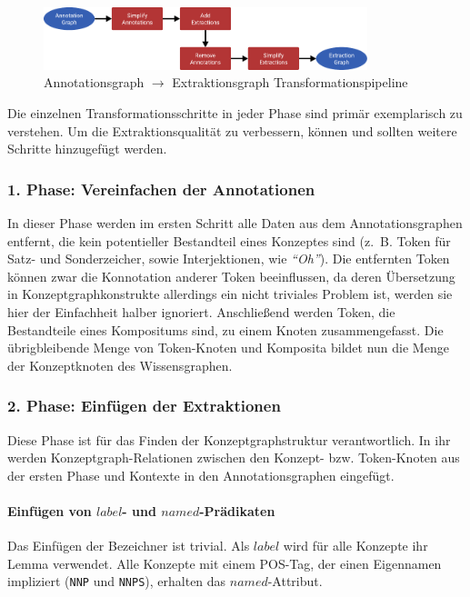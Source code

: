 \begin{figure}[h]
	\centering
	\includegraphics[width=0.84\textwidth]{gfx/text2kg/transformationPipeline.pdf}
	\caption{Annotationsgraph $\rightarrow$ Extraktionsgraph Transformationspipeline}\label{fig:text2kg:transformationPipeline}
\end{figure}
Die einzelnen Transformationsschritte in jeder Phase sind primär exemplarisch zu verstehen.
Um die Extraktionsqualität zu verbessern, können und sollten weitere Schritte hinzugefügt werden.

\subsubsection{1. Phase: Vereinfachen der Annotationen}
In dieser Phase werden im ersten Schritt alle Daten aus dem Annotationsgraphen entfernt, die kein potentieller Bestandteil eines Konzeptes sind (z.~B. Token für Satz- und Sonderzeicher, sowie Interjektionen, wie \textit{``Oh''}).
Die entfernten Token können zwar die Konnotation anderer Token beeinflussen, da deren Übersetzung in Konzeptgraphkonstrukte allerdings ein nicht triviales Problem ist, werden sie hier der Einfachheit halber ignoriert.
Anschließend werden Token, die Bestandteile eines Kompositums sind, zu einem Knoten zusammengefasst.
Die übrigbleibende Menge von Token-Knoten und Komposita bildet nun die Menge der Konzeptknoten des Wissensgraphen.

\subsubsection{2. Phase: Einfügen der Extraktionen}
Diese Phase ist für das Finden der Konzeptgraphstruktur verantwortlich.
In ihr werden Konzeptgraph-Relationen zwischen den Konzept- bzw. Token-Knoten aus der ersten Phase und Kontexte in den Annotationsgraphen eingefügt.

\paragraph{Einfügen von $label$- und $named$-Prädikaten}
Das Einfügen der Bezeichner ist trivial.
Als $label$ wird für alle Konzepte ihr Lemma verwendet.
Alle Konzepte mit einem POS-Tag, der einen Eigennamen impliziert (\texttt{NNP} und \texttt{NNPS}), erhalten das $named$-Attribut.

